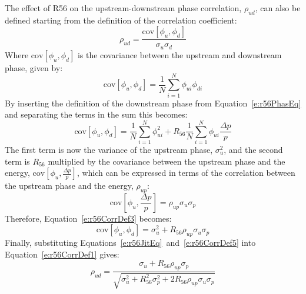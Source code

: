 The effect of R56 on the upstream-downstream phase correlation, \(\rho_{ud}\), can also be defined starting from the definition of the correlation coefficient:
\begin{equation}
\rho_{ud} = \frac{\mathrm{cov}\left[\phi_u,\phi_d\right]}{\sigma_u\sigma_d}
\label{e:r56CorrDef1}
\end{equation}
Where \(\mathrm{cov}\left[\phi_u,\phi_d\right]\) is the covariance between the upstream and downstream phase, given by:
\begin{equation}
 \mathrm{cov}\left[\phi_u,\phi_d\right] = \frac{1}{N} \sum_{i=1}^{N}\phi_{ui}\phi_{di}
\label{e:r56CorrDef2}
\end{equation} 
By inserting the definition of the downstream phase from Equation~\ref{e:r56PhasEq} and separating the terms in the sum this becomes:
\begin{equation}
\mathrm{cov}\left[\phi_u,\phi_d\right] = \frac{1}{N} \sum_{i=1}^{N}\phi_{ui}^{2} + R_{56}\frac{1}{N} \sum_{i=1}^{N}\phi_{ui}\frac{\Delta p}{p}
\label{e:r56CorrDef3}
\end{equation}
The first term is now the variance of the upstream phase, \(\sigma_u^2\), and the second term is \(R_{56}\) multiplied by the covariance between the upstream phase and the energy, \(\mathrm{cov}\left[\phi_u,\frac{\Delta p}{p}\right]\), which can be expressed in terms of the correlation between the upstream phase and the energy, \(\rho_{up}\):
\begin{equation}
\mathrm{cov}\left[\phi_u,\frac{\Delta p}{p}\right] = \rho_{up}\sigma_u\sigma_{p}
\label{e:r56CorrDef4}
\end{equation}
Therefore, Equation~\ref{e:r56CorrDef3} becomes:
\begin{equation}
\mathrm{cov}\left[\phi_u,\phi_d\right] = \sigma_u^2 + R_{56}\rho_{up}\sigma_u\sigma_p
\label{e:r56CorrDef5}
\end{equation}
Finally, substituting Equations~\ref{e:r56JitEq}~and~\ref{e:r56CorrDef5} into Equation~\ref{e:r56CorrDef1} gives:
\begin{equation}
\rho_{ud} = \frac{\sigma_u + R_{56}\rho_{up}\sigma_p}{\sqrt{\sigma_u^2 + R_{56}^2\sigma_{p}^2 + 2R_{56}\rho_{up}\sigma_{u}\sigma_{p}}}
\label{e:r56CorrDefFinal}
\end{equation}

